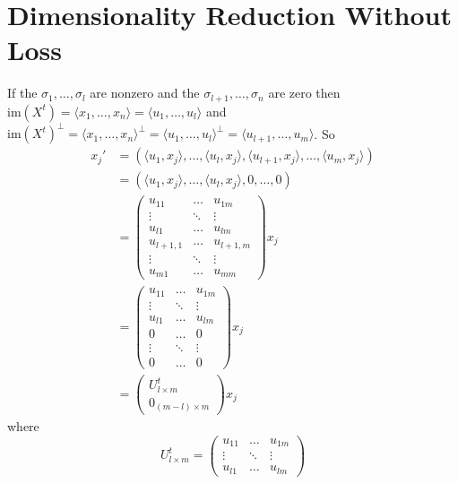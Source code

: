 \documentclass[12pt]{amsart}
\theoremstyle{definition}
\begin{document}
\section{Dimensionality Reduction Without Loss} If the $\sigma_1, \dots , \sigma_l$ are nonzero and the $\sigma_{l+1}, \dots , \sigma_n$ are zero then $\text{im}(X^t) = \langle x_1, \dots , x_n \rangle = \langle u_1, \dots , u_l \rangle$ and $\text{im}(X^t)^{\perp} = \langle x_1, \dots , x_n \rangle^{\perp} = \langle u_1, \dots , u_l \rangle^{\perp} = \langle u_{l+1}, \dots , u_m \rangle$. So
\begin{align*}
x_j' & = (\langle u_1, x_j \rangle, \dots , \langle u_l, x_j \rangle, \langle u_{l+1}, x_j \rangle, \dots , \langle u_m, x_j \rangle) \\
 & = (\langle u_1, x_j \rangle, \dots , \langle u_l, x_j \rangle, 0, \dots , 0) \\
 & = \left( \begin{array}{ccc} u_{11} & \dots & u_{1m} \\ \vdots & \ddots & \vdots \\ u_{l1} & \dots & u_{lm} \\ u_{l+1, 1} & \dots & u_{l+1, m} \\ \vdots & \ddots & \vdots \\ u_{m1} & \dots & u_{mm} \end{array} \right) x_j \\
 & = \left( \begin{array}{ccc} u_{11} & \dots & u_{1m} \\ \vdots & \ddots & \vdots \\ u_{l1} & \dots & u_{lm} \\ 0 & \dots & 0 \\ \vdots & \ddots & \vdots \\ 0 & \dots & 0 \end{array} \right) x_j \\
 & = \left( \begin{array}{c} U^t_{l \times m} \\ 0_{(m-l) \times m} \end{array} \right) x_j
\end{align*}
where
$$U^t_{l \times m} = \left( \begin{array}{ccc} u_{11} & \dots & u_{1m} \\ \vdots & \ddots & \vdots \\ u_{l1} & \dots & u_{lm} \end{array} \right)$$
\end{document}
